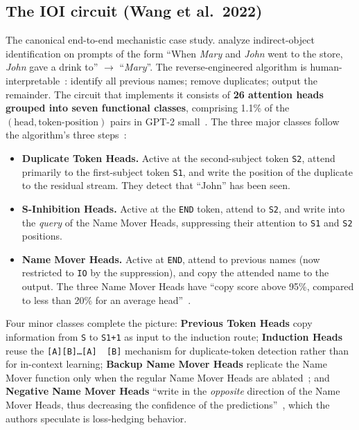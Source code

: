 \subsection{The IOI circuit (Wang et al.\ 2022)}
\label{sec:circuit-ioi}

The canonical end-to-end mechanistic case study. \citet{wang2022-ioi}
analyze indirect-object identification on prompts of the form ``When
\textit{Mary} and \textit{John} went to the store, \textit{John} gave a
drink to'' \(\to\) ``\textit{Mary}''. The reverse-engineered algorithm
is human-interpretable~\citep[\S 1]{wang2022-ioi}: identify all
previous names; remove duplicates; output the remainder. The circuit
that implements it consists of \textbf{26 attention heads grouped into
seven functional classes}, comprising 1.1\% of the
$(\text{head}, \text{token-position})$ pairs in GPT-2
small~\citep[Abstract]{wang2022-ioi}. The three major classes follow
the algorithm's three steps~\citep[\S 3]{wang2022-ioi}:
\begin{itemize}
  \item \textbf{Duplicate Token Heads.} Active at the second-subject
    token \texttt{S2}, attend primarily to the first-subject token
    \texttt{S1}, and write the position of the duplicate to the residual
    stream. They detect that ``John'' has been seen.
  \item \textbf{S-Inhibition Heads.} Active at the \texttt{END} token,
    attend to \texttt{S2}, and write into the \emph{query} of the Name
    Mover Heads, suppressing their attention to \texttt{S1} and
    \texttt{S2} positions.
  \item \textbf{Name Mover Heads.} Active at \texttt{END}, attend to
    previous names (now restricted to \texttt{IO} by the suppression),
    and copy the attended name to the output. The three Name Mover
    Heads have ``copy score above 95\%, compared to less than 20\% for
    an average head''~\citep[\S 3.1]{wang2022-ioi}.
\end{itemize}
Four minor classes complete the picture: \textbf{Previous Token Heads}
copy information from \texttt{S} to \texttt{S1+1} as input to the
induction route; \textbf{Induction Heads} reuse the
\citet{olsson2022-induction-heads} \texttt{[A][B]\ldots[A]\,\to\,[B]}
mechanism for duplicate-token detection rather than for in-context
learning; \textbf{Backup Name Mover Heads} replicate the Name Mover
function only when the regular Name Mover Heads are
ablated~\citep[\S 3]{wang2022-ioi}; and \textbf{Negative Name Mover
Heads} ``write in the \emph{opposite} direction of the Name Mover
Heads, thus decreasing the confidence of the
predictions''~\citep[\S 3]{wang2022-ioi}, which the authors speculate
is loss-hedging behavior.

